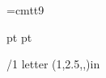 
\font\ninett=cmtt9




 pt
 pt

\def\StarbuckGreen{\setcmykcolor{1.0 0 0.5 0.6}}

\fixmnotes\right \mnotesize=1.7in \def\mnotehook{\typosize[8/10]\it}
\mnoteindent=20pt
\margins/1 letter (1,2.5,,)in

\hyperlinks \Green \Blue %

\def\tthook{\typosize[9/11]}  %

%
%
\def\date#1{\vskip10pt \noindent{\bf #1}\hfill\vskip 5pt
  \everypar={{\setbox0\lastbox}\everypar={}}}

%
\def\symbol{\begingroup\catcode`\_=12\relax\symbolimpl}
\def\symbolimpl#1{{\ninett #1}\endgroup}



